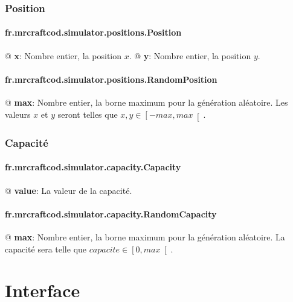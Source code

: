 \documentclass[final]{polytech/polytech}
\begin{document}
			\subsubsection{Position\label{sec:jsonconf:pos}}
				\paragraph{fr.mrcraftcod.simulator.positions.Position}
					\begin{easylist}[itemize]
						@ \textbf{x}: Nombre entier, la position $x$.
						@ \textbf{y}: Nombre entier, la position $y$.
					\end{easylist}
					
				\paragraph{fr.mrcraftcod.simulator.positions.RandomPosition}
					\begin{easylist}[itemize]
						@ \textbf{max}: Nombre entier, la borne maximum pour la génération aléatoire. Les valeurs $x$ et $y$ seront telles que $x,y\in\left[-max, max\right[$.
					\end{easylist}
			
			\subsubsection{Capacité\label{sec:jsonconf:capacity}}
				\paragraph{fr.mrcraftcod.simulator.capacity.Capacity}
					\begin{easylist}[itemize]
						@ \textbf{value}: La valeur de la capacité.
					\end{easylist}
					
				\paragraph{fr.mrcraftcod.simulator.capacity.RandomCapacity}
					\begin{easylist}[itemize]
						@ \textbf{max}: Nombre entier, la borne maximum pour la génération aléatoire. La capacité sera telle que $capacite\in\left[0, max\right[$.
					\end{easylist}
	
	\section{Interface}
		
\end{document}
